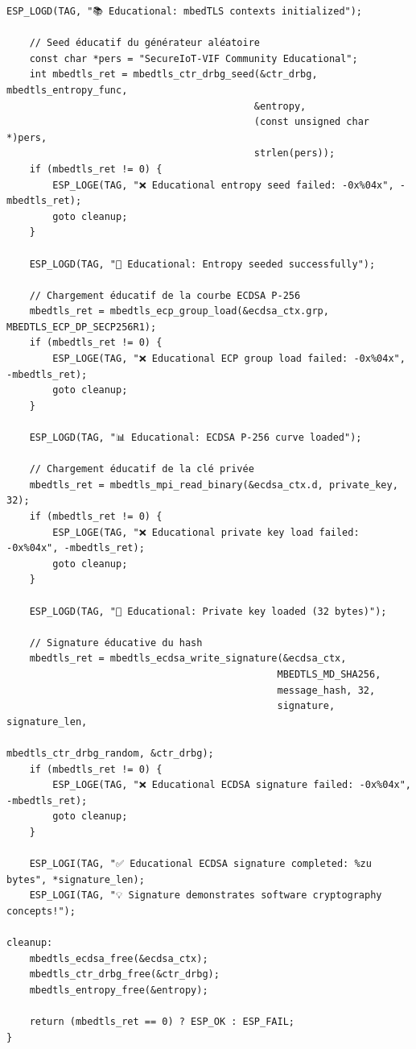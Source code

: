 \begin{lstlisting}[caption={Optimisations éducatives avec mbedTLS}]
    ESP_LOGD(TAG, "📚 Educational: mbedTLS contexts initialized");
    
    // Seed éducatif du générateur aléatoire
    const char *pers = "SecureIoT-VIF Community Educational";
    int mbedtls_ret = mbedtls_ctr_drbg_seed(&ctr_drbg, mbedtls_entropy_func, 
                                           &entropy, 
                                           (const unsigned char *)pers, 
                                           strlen(pers));
    if (mbedtls_ret != 0) {
        ESP_LOGE(TAG, "❌ Educational entropy seed failed: -0x%04x", -mbedtls_ret);
        goto cleanup;
    }
    
    ESP_LOGD(TAG, "🎲 Educational: Entropy seeded successfully");
    
    // Chargement éducatif de la courbe ECDSA P-256
    mbedtls_ret = mbedtls_ecp_group_load(&ecdsa_ctx.grp, MBEDTLS_ECP_DP_SECP256R1);
    if (mbedtls_ret != 0) {
        ESP_LOGE(TAG, "❌ Educational ECP group load failed: -0x%04x", -mbedtls_ret);
        goto cleanup;
    }
    
    ESP_LOGD(TAG, "📊 Educational: ECDSA P-256 curve loaded");
    
    // Chargement éducatif de la clé privée
    mbedtls_ret = mbedtls_mpi_read_binary(&ecdsa_ctx.d, private_key, 32);
    if (mbedtls_ret != 0) {
        ESP_LOGE(TAG, "❌ Educational private key load failed: -0x%04x", -mbedtls_ret);
        goto cleanup;
    }
    
    ESP_LOGD(TAG, "🔑 Educational: Private key loaded (32 bytes)");
    
    // Signature éducative du hash
    mbedtls_ret = mbedtls_ecdsa_write_signature(&ecdsa_ctx, 
                                               MBEDTLS_MD_SHA256,
                                               message_hash, 32,
                                               signature, signature_len,
                                               mbedtls_ctr_drbg_random, &ctr_drbg);
    if (mbedtls_ret != 0) {
        ESP_LOGE(TAG, "❌ Educational ECDSA signature failed: -0x%04x", -mbedtls_ret);
        goto cleanup;
    }
    
    ESP_LOGI(TAG, "✅ Educational ECDSA signature completed: %zu bytes", *signature_len);
    ESP_LOGI(TAG, "💡 Signature demonstrates software cryptography concepts!");
    
cleanup:
    mbedtls_ecdsa_free(&ecdsa_ctx);
    mbedtls_ctr_drbg_free(&ctr_drbg);
    mbedtls_entropy_free(&entropy);
    
    return (mbedtls_ret == 0) ? ESP_OK : ESP_FAIL;
}


\end{lstlisting}
